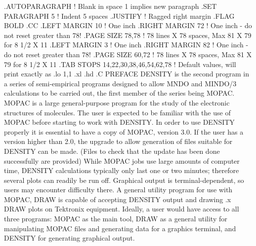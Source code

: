 .AUTOPARAGRAPH          ! Blank in space 1 implies new paragraph
.SET PARAGRAPH 5        ! Indent 5 spaces
.JUSTIFY                ! Ragged right margin
.FLAG BOLD
.CC
.LEFT MARGIN 10                 ! One inch
.RIGHT MARGIN 72        ! One inch - do not reset greater than 78!
.PAGE SIZE 78,78        ! 78 lines X 78 spaces, Max 81 X 79 for 8 1/2 X 11
.LEFT MARGIN 3                 ! One inch
.RIGHT MARGIN 82        ! One inch - do not reset greater than 78!
.PAGE SIZE 60,72        ! 78 lines X 78 spaces, Max 81 X 79 for 8 1/2 X 11
.TAB STOPS 14,22,30,38,46,54,62,78 ! Default values, will print exactly as
.lo 1,1
.xl
.hd
.C
PREFACE
 DENSITY is the second program in a series of semi-empirical
programs designed to allow MNDO and MINDO/3 calculations to be
carried out, the first member of the series being  MOPAC. 
 MOPAC is a large general-purpose program for the study of
the electronic structures of molecules. The user is expected to
be familiar with the use of MOPAC before starting to work with
DENSITY.
In order to use DENSITY properly it is essential to have a
copy of MOPAC, version 3.0. If the user has a version higher
than 2.0, the upgrade to allow generation of files suitable 
for DENSITY can be made. (Files to check that the update
has been done successfully are provided)
 While MOPAC jobs use large amounts of computer time, DENSITY
calculations typically only last one or two minutes; therefore several
plots can readily be run off.
 Graphical output is terminal-dependent, so users may encounter
difficulty there. A general utility program for use with MOPAC,
DRAW is capable of accepting DENSITY output and drawing
.x DRAW
plots on Tektronix equipment. Ideally, a user would have access to
all three programs: MOPAC as the main tool, DRAW as a
general utility for manipulating MOPAC files and generating
data for a graphics terminal, and DENSITY
for generating graphical output.
 
 

